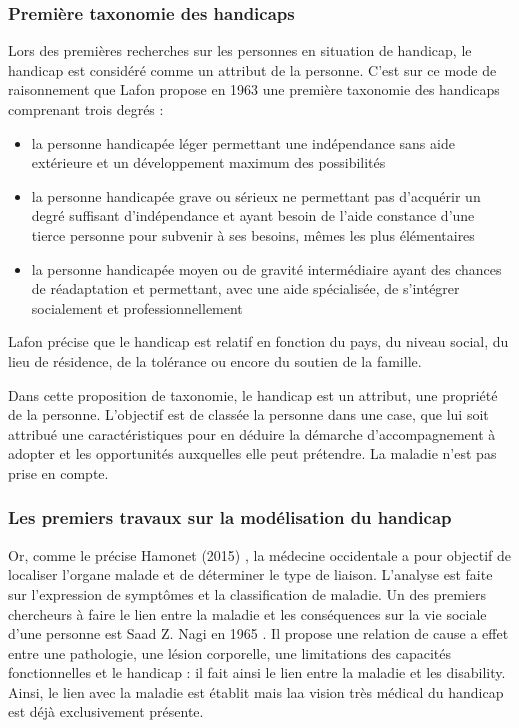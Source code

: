 \subsubsection{Première taxonomie des handicaps}
 Lors des premières recherches sur les personnes en situation de handicap, le handicap est considéré comme un attribut de la personne. C'est sur ce mode de raisonnement que Lafon propose en 1963 \cite{Lafon1963} une première taxonomie des handicaps comprenant trois degrés : 
\begin{itemize}
\item la personne handicapée léger permettant une indépendance sans aide extérieure et un développement maximum des possibilités
\item la personne handicapée grave ou sérieux ne permettant pas d'acquérir un degré suffisant d'indépendance et ayant besoin de l'aide constance d'une tierce personne pour subvenir à ses besoins, mêmes les plus élémentaires
\item la personne handicapée moyen ou de gravité intermédiaire ayant des chances de réadaptation et permettant, avec une aide spécialisée, de s'intégrer socialement et professionnellement
\end{itemize}
Lafon précise que le handicap est relatif en fonction du pays, du niveau social, du lieu de résidence, de la tolérance ou encore du soutien de la famille.

Dans cette proposition de taxonomie, le handicap est un attribut, une propriété de la personne. L'objectif est de classée la personne dans une case, que lui soit attribué une caractéristiques pour en déduire la démarche d'accompagnement à adopter et les opportunités auxquelles elle peut prétendre. La maladie n'est pas prise en compte.

\subsubsection{Les premiers travaux sur la modélisation du handicap}
Or, comme le précise Hamonet (2015) \cite{Hamonet2015}, la médecine occidentale a pour objectif de localiser l'organe malade et de déterminer le type de liaison. L'analyse est faite sur l'expression de symptômes et la classification de maladie.
Un des premiers chercheurs à faire le lien entre la maladie et les conséquences sur la vie sociale d'une personne est Saad Z. Nagi en 1965 \cite{Nagi1965}. Il propose une relation de cause a effet entre une pathologie, une lésion corporelle, une limitations des capacités fonctionnelles et le handicap : il fait ainsi le lien entre la maladie et les \og disability\fg{}. Ainsi, le lien avec la maladie est établit mais laa vision très médical du handicap est déjà exclusivement présente. 


